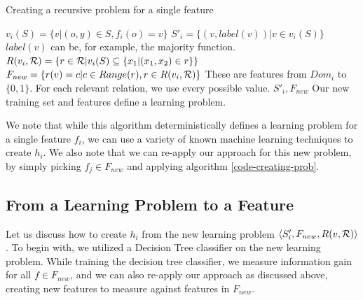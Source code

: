 \documentclass[twoside,11pt]{article}
\theoremstyle{definition}
\begin{document}
\begin{algorithm}[H]
	\caption{Creating a recursive problem for a single feature}
	\label{code-creating-prob}
	\small
		\begin{algorithmic}
                \State $v_i(S) = \{v | (o,y) \in S, f_{i}(o)=v\}$
                \State $S'_i = \{ (v, label(v)) | v \in v_i(S) \}$ 
                \Comment $label(v)$ can be, for example, the majority function.
                \State $R(v_i,{\cal R}) = \left\{ r \in {\cal R} | v_i(S) \subseteq \{x_1 | (x_1,x_2) \in r\}\right\}$
                \State $F_{new}=\{r(v)=c| c\in Range(r), r\in R(v_i,{\cal R})\}$
                \State \Comment These are features from $Dom_{i}$ to $\{0,1\}$. For each relevant relation, we use every possible value.
                \Return $S'_i, F_{new}$ 
                \Comment Our new training set and features define a learning problem.
			\EndFunction
			
		\end{algorithmic}
	\end{algorithm}

We note that while this algorithm deterministically defines a learning problem for a single feature $f_i$, we can use a variety of known machine learning techniques to create $h_i$.
We also note that we can re-apply our approach for this new problem, by simply picking $f_j\in F_{new}$ and applying algorithm \ref{code-creating-prob}.

\subsection{From a Learning Problem to a Feature}

Let us discuss how to create $h_i$ from the new learning problem $\langle S'_i,F_{new},R(v,{\cal R})\rangle$.
To begin with, we utilized a Decision Tree classifier \cite{quinlan1986} on the new learning problem. While training the decision tree classifier, we measure information gain for all $f\in F_{new}$, and we can also re-apply our approach as discussed above, creating new features to measure against features in $F_{new}$.
\end{document}

